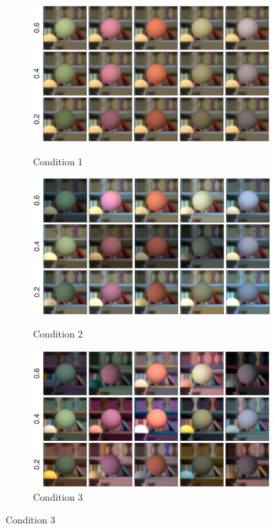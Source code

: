 \documentclass{jov}
\begin{document}
\begin{figure}
\centering
	\begin{subfigure}[b]{0.33 \textwidth}
		\caption{Condition 1}
		\includegraphics[width=\textwidth]{../FiguresDraft4/Figure1/Figure1_b.png}
 		\label{fig:backgroundVarying}
	\end{subfigure}
	\begin{subfigure}[b]{0.33 \textwidth}
        \caption{Condition 2}	
        \includegraphics[width=\textwidth]{../FiguresDraft4/Figure2/Figure2_b.png}
        \label{fig:targetIlluminantVarying}
    \end{subfigure}
	\begin{subfigure}[b]{0.33 \textwidth}
	\caption{Condition 3}	
        \includegraphics[width=\textwidth]{../FiguresDraft4/Figure2/Figure2_c.png}        

\end{subfigure}
\end{figure}
\end{document}
